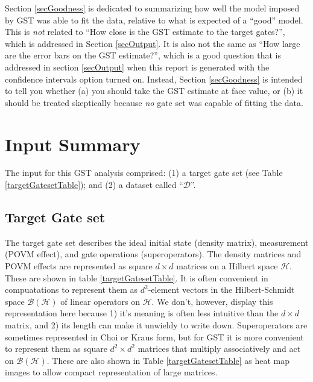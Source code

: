 \documentclass{article}[11pt]
\begin{document}
Section \ref{secGoodness} is dedicated to summarizing how well the model imposed by GST was able to fit the data, relative to what is expected of a ``good'' model.  This is \emph{not} related to ``How close is the GST estimate to the target gates?'', which is addressed in Section \ref{secOutput}.  It is also not the same as ``How large are the error bars on the GST estimate?'', which is a good question that is addressed in section \ref{secOutput} when this report is generated with the confidence intervals option turned on.  Instead, Section \ref{secGoodness} is intended to tell you whether (a) you should take the GST estimate at face value, or (b) it should be treated skeptically because \emph{no} gate set was capable of fitting the data.


\section{Input Summary\label{secInput}}
The input for this GST analysis comprised: (1) a target gate set (see Table \ref{targetGatesetTable}); and (2) a dataset called ``$\mathcal{D}$''.

\subsection{Target Gate set}

The target gate set describes the ideal initial state (density matrix), measurement (POVM effect), and gate operations (superoperators).  The density matrices and POVM effects are represented as square $d\times d$ matrices on a Hilbert space $\mathcal{H}$.  These are shown in table \ref{targetGatesetTable}.  It is often convenient in compuatations to represent them as $d^2$-element vectors in the Hilbert-Schmidt space $\mathcal{B}(\mathcal{H})$ of linear operators on $\mathcal{H}$.  We don't, however, display this representation here because 1) it's meaning is often less intuitive than the $d\times d$ matrix, and 2) its length can make it unwieldy to write down.  Superoperators are sometimes represented in Choi or Kraus form, but for GST it is more convenient to represent them as square $d^2\times d^2$ matrices that multiply associatively and act on $\mathcal{B}(\mathcal{H})$.  These are also shown in Table \ref{targetGatesetTable} as heat map images to allow compact representation of large matrices.
\end{document}
